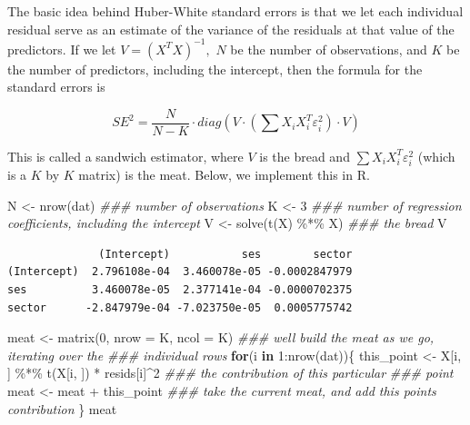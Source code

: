 \documentclass[
  letterpaper,
  DIV=11,
  numbers=noendperiod]{scrreprt}
\newenvironment{Shaded}{}{}
\newcommand{\AttributeTok}[1]{\textcolor[rgb]{0.49,0.56,0.16}{#1}}
\newcommand{\ControlFlowTok}[1]{\textcolor[rgb]{0.00,0.44,0.13}{\textbf{#1}}}
\newcommand{\DecValTok}[1]{\textcolor[rgb]{0.25,0.63,0.44}{#1}}
\newcommand{\DocumentationTok}[1]{\textcolor[rgb]{0.73,0.13,0.13}{\textit{#1}}}
\newcommand{\FunctionTok}[1]{\textcolor[rgb]{0.02,0.16,0.49}{#1}}
\newcommand{\NormalTok}[1]{#1}
\newcommand{\OtherTok}[1]{\textcolor[rgb]{0.00,0.44,0.13}{#1}}
\newcommand{\SpecialCharTok}[1]{\textcolor[rgb]{0.25,0.44,0.63}{#1}}
\begin{document}
The basic idea behind Huber-White standard errors is that we let each
individual residual serve as an estimate of the variance of the
residuals at that value of the predictors. If we let
\(V = (X^TX)^{-1},\) \(N\) be the number of observations, and \(K\) be
the number of predictors, including the intercept, then the formula for
the standard errors is

\[ SE^2 = \frac{N}{N-K} \cdot diag\left( V \cdot \left( \sum X_i X_i^T \varepsilon_i^2 \right) \cdot V\right) \]

This is called a sandwich estimator, where \(V\) is the bread and
\(\sum X_i X_i^T \varepsilon_i^2\) (which is a \(K\) by \(K\) matrix) is
the meat. Below, we implement this in R.

\begin{Shaded}
\begin{Highlighting}[]
\NormalTok{N }\OtherTok{\textless{}{-}} \FunctionTok{nrow}\NormalTok{(dat) }\DocumentationTok{\#\#\# number of observations}
\NormalTok{K }\OtherTok{\textless{}{-}} \DecValTok{3} \DocumentationTok{\#\#\# number of regression coefficients, including the intercept}
\NormalTok{V }\OtherTok{\textless{}{-}} \FunctionTok{solve}\NormalTok{(}\FunctionTok{t}\NormalTok{(X) }\SpecialCharTok{\%*\%}\NormalTok{ X) }\DocumentationTok{\#\#\# the bread}
\NormalTok{V}
\end{Highlighting}
\end{Shaded}

\begin{verbatim}
              (Intercept)           ses        sector
(Intercept)  2.796108e-04  3.460078e-05 -0.0002847979
ses          3.460078e-05  2.377141e-04 -0.0000702375
sector      -2.847979e-04 -7.023750e-05  0.0005775742
\end{verbatim}

\begin{Shaded}
\begin{Highlighting}[]
\NormalTok{meat }\OtherTok{\textless{}{-}} \FunctionTok{matrix}\NormalTok{(}\DecValTok{0}\NormalTok{, }\AttributeTok{nrow =}\NormalTok{ K, }\AttributeTok{ncol =}\NormalTok{ K) }\DocumentationTok{\#\#\# we\textquotesingle{}ll build the meat as we go, iterating over the }
                                      \DocumentationTok{\#\#\# individual rows}
\ControlFlowTok{for}\NormalTok{(i }\ControlFlowTok{in} \DecValTok{1}\SpecialCharTok{:}\FunctionTok{nrow}\NormalTok{(dat))\{}
\NormalTok{  this\_point }\OtherTok{\textless{}{-}}\NormalTok{ X[i, ] }\SpecialCharTok{\%*\%} \FunctionTok{t}\NormalTok{(X[i, ]) }\SpecialCharTok{*}\NormalTok{ resids[i]}\SpecialCharTok{\^{}}\DecValTok{2} \DocumentationTok{\#\#\# the contribution of this particular }
                                                   \DocumentationTok{\#\#\# point}
\NormalTok{  meat }\OtherTok{\textless{}{-}}\NormalTok{ meat }\SpecialCharTok{+}\NormalTok{ this\_point }\DocumentationTok{\#\#\# take the current meat, and add this point\textquotesingle{}s contribution}
\NormalTok{\}}
\NormalTok{meat}
\end{Highlighting}
\end{Shaded}
\end{document}

